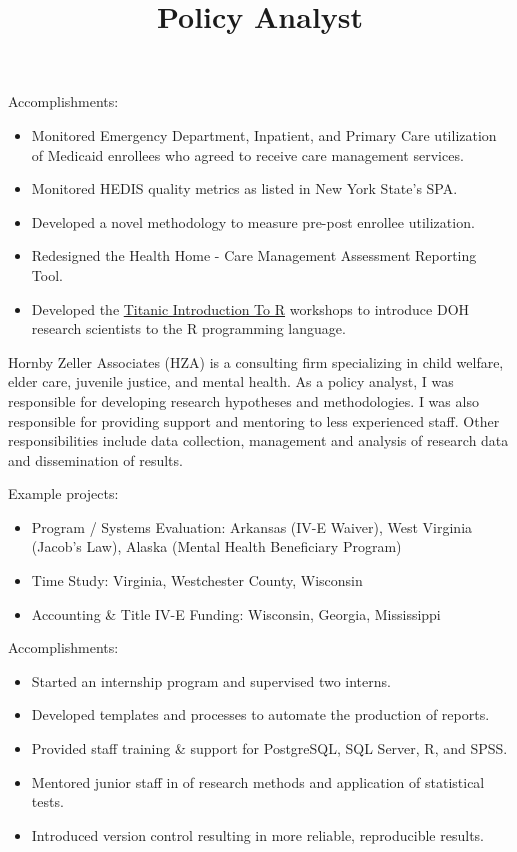 \documentclass[line, margin, 10pt]{res}
\begin{document}
\begin{resume}
\begin{position}
    Accomplishments:
    \begin{itemize}
    \item Monitored Emergency Department, Inpatient, and Primary Care
      utilization of Medicaid enrollees who agreed to receive care
      management services.
    \item Monitored HEDIS quality metrics as listed in New York
      State’s SPA.
    \item Developed a novel methodology to measure pre-post enrollee utilization.
    \item Redesigned the Health Home - Care Management Assessment
      Reporting Tool.
    \item Developed the
      \href{http://choens.github.io/titanic/}{Titanic Introduction To
        R} workshops to introduce DOH research scientists to the R
      programming language.
    \end{itemize}
 
  \end{position}

  \title{Policy Analyst}
  \begin{position}
    Hornby Zeller Associates (HZA) is a consulting firm specializing
    in child welfare, elder care, juvenile justice, and mental
    health. As a policy analyst, I was responsible for developing
    research hypotheses and methodologies. I was also responsible for
    providing support and mentoring to less experienced staff. Other
    responsibilities include data collection, management and analysis
    of research data and dissemination of results.

    Example projects:
    \begin{itemize}
    \item Program / Systems Evaluation: Arkansas (IV-E Waiver), West
      Virginia (Jacob's Law), Alaska (Mental Health Beneficiary Program)
    \item Time Study: Virginia, Westchester County, Wisconsin
    \item Accounting \& Title IV-E Funding: Wisconsin, Georgia, Mississippi
    \end{itemize}

    Accomplishments:
    \begin{itemize}
    \item Started an internship program and supervised two interns.
    \item Developed templates and processes to automate the production
      of reports.
    \item Provided staff training \& support for PostgreSQL, SQL
      Server, R, and SPSS.
    \item Mentored junior staff in of research methods and application
      of statistical tests.
    \item Introduced version control resulting in more reliable, reproducible results.
    \end{itemize}
  \end{position}


\end{resume}
\end{document}
